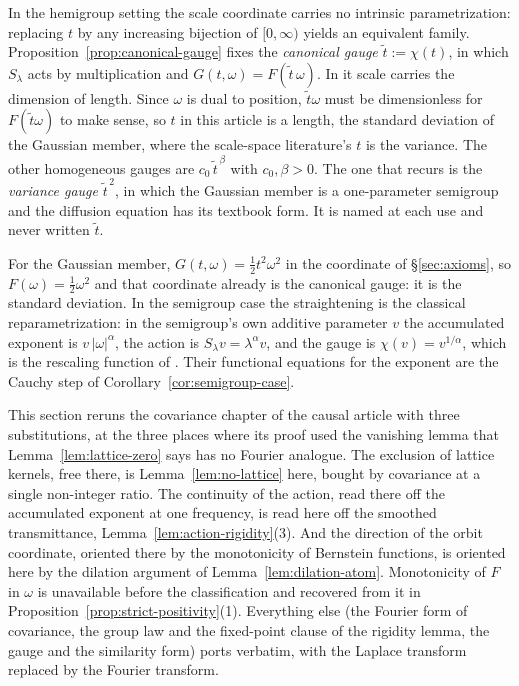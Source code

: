 \begin{remark}\label{rem:gauge-freedom}
In the hemigroup setting the scale coordinate carries no intrinsic parametrization: replacing
$t$ by any increasing bijection of $[0,\infty)$ yields an equivalent family.
Proposition~\ref{prop:canonical-gauge} fixes the \emph{canonical gauge} $\tilde t := \chi(t)$,
in which $S_\lambda$ acts by multiplication and $G(t,\omega) = F(\tilde t\,\omega)$. In it
scale carries the dimension of length. Since $\omega$ is dual to position, $\tilde t\omega$
must be dimensionless for $F(\tilde t\omega)$ to make sense, so $t$ in this article is a
length, the standard deviation of the Gaussian member, where the scale-space literature's $t$
is the variance. The other homogeneous gauges are $c_0\,\tilde t^{\,\beta}$ with
$c_0, \beta > 0$. The one that recurs is the \emph{variance gauge} $\tilde t^{\,2}$, in which the Gaussian
member is a one-parameter semigroup and the diffusion equation has its textbook form. It is
named at each use and never written $\tilde t$.
\end{remark}

For the Gaussian member, $G(t,\omega) = \tfrac12t^2\omega^2$ in the coordinate of
\S\ref{sec:axioms}, so $F(\omega) = \tfrac12\omega^2$ and that coordinate already is the
canonical gauge: it is the standard deviation. In the semigroup case the straightening is the
classical reparametrization: in the semigroup's own additive parameter $v$ the accumulated
exponent is $v\,|\omega|^\alpha$, the action is $S_\lambda v = \lambda^\alpha v$, and the gauge
is $\chi(v) = v^{1/\alpha}$, which is the rescaling function of
. Their functional equations for the exponent are the Cauchy step
of Corollary~\ref{cor:semigroup-case}.

\begin{remark}\label{rem:causal-relation-covariance}
This section reruns the covariance chapter of the causal article
 with three substitutions, at the three places where
its proof used the vanishing lemma that Lemma~\ref{lem:lattice-zero} says has no Fourier
analogue. The exclusion of lattice kernels, free there, is Lemma~\ref{lem:no-lattice} here,
bought by covariance at a single non-integer ratio. The continuity of the action, read there
off the accumulated exponent at one frequency, is read here off the smoothed transmittance,
Lemma~\ref{lem:action-rigidity}(3). And the direction of the orbit coordinate, oriented there
by the monotonicity of Bernstein functions, is oriented here by the dilation argument of
Lemma~\ref{lem:dilation-atom}. Monotonicity of $F$ in $\omega$ is unavailable before the
classification and recovered from it in Proposition~\ref{prop:strict-positivity}(1).
Everything else (the Fourier form of covariance, the group law and the fixed-point clause
of the rigidity lemma, the gauge and the similarity form) ports verbatim, with the Laplace
transform replaced by the Fourier transform.
\end{remark}
